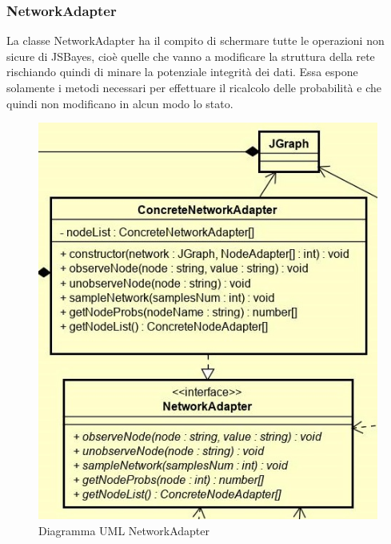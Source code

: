 \subsubsection{NetworkAdapter}
La classe NetworkAdapter ha il compito di schermare tutte le operazioni non sicure di JSBayes, cioè quelle che vanno a modificare la struttura della rete rischiando quindi di minare la potenziale integrità dei dati.
Essa espone solamente i metodi necessari per effettuare il ricalcolo delle probabilità e che quindi non modificano in alcun modo lo stato.
\begin{figure} [H]
	\centering
	\includegraphics[scale=0.7]{Img/NetworkAdapter2}
	\caption{Diagramma UML NetworkAdapter}\label{}
\end{figure}
